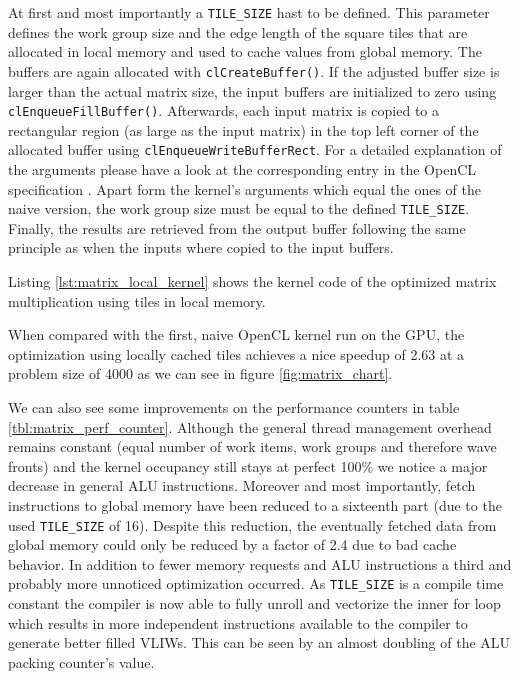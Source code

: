 At first and most importantly a \lstinline!TILE_SIZE! hast to be defined. This parameter defines the work group size and the edge length of the square tiles that are allocated in local memory and used to cache values from global memory.
The buffers are again allocated with \lstinline!clCreateBuffer()!. If the adjusted buffer size is larger than the actual matrix size, the input buffers are initialized to zero using \lstinline!clEnqueueFillBuffer()!. Afterwards, each input matrix is copied to a rectangular region (as large as the input matrix) in the top left corner of the allocated buffer using \lstinline!clEnqueueWriteBufferRect!. For a detailed explanation of the arguments please have a look at the corresponding entry in the OpenCL specification \cite[p.76]{opencl_spec}. Apart form the kernel's arguments which equal the ones of the naive version, the work group size must be equal to the defined \lstinline!TILE_SIZE!. Finally, the results are retrieved from the output buffer following the same principle as when the inputs where copied to the input buffers.

Listing \ref{lst:matrix_local_kernel} shows the kernel code of the optimized matrix multiplication using tiles in local memory.



When compared with the first, naive OpenCL kernel run on the GPU, the optimization using locally cached tiles achieves a nice speedup of 2.63 at a problem size of 4000 as we can see in figure \ref{fig:matrix_chart}. %

We can also see some improvements on the performance counters in table \ref{tbl:matrix_perf_counter}. Although the general thread management overhead remains constant (equal number of work items, work groups and therefore wave fronts) and the kernel occupancy still stays at perfect 100\% we notice a major decrease in general ALU instructions. Moreover and most importantly, fetch instructions to global memory have been reduced to a sixteenth part (due to the used \lstinline!TILE_SIZE! of 16). Despite this reduction, the eventually fetched data from global memory could only be reduced by a factor of 2.4 due to bad cache behavior.
In addition to fewer memory requests and ALU instructions a third and probably more unnoticed optimization occurred. As \lstinline!TILE_SIZE! is a compile time constant the compiler is now able to fully unroll and vectorize the inner for loop which results in more independent instructions available to the compiler to generate better filled VLIWs. This can be seen by an almost doubling of the ALU packing counter's value.


